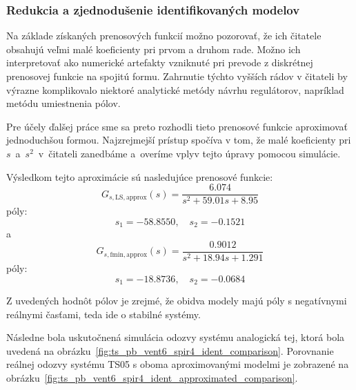 
\subsubsection{Redukcia a zjednodušenie identifikovaných modelov}

Na základe získaných prenosových funkcií možno pozorovať, že ich čitatele obsahujú veľmi malé koeficienty pri prvom a druhom rade.  
Možno ich interpretovať ako numerické artefakty vzniknuté pri prevode z diskrétnej prenosovej funkcie na spojitú formu.  
Zahrnutie týchto vyšších rádov v čitateli by výrazne komplikovalo niektoré analytické metódy návrhu regulátorov, napríklad metódu umiestnenia pólov.

Pre účely ďalšej práce sme sa preto rozhodli tieto prenosové funkcie aproximovať jednoduchšou formou.  
Najzrejmejší prístup spočíva v tom, že malé koeficienty pri $s$~a~$s^2$~v~čitateli zanedbáme a~overíme vplyv tejto úpravy pomocou simulácie.

Výsledkom tejto aproximácie sú nasledujúce prenosové funkcie:
\begin{equation}
	G_{s,\mathrm{LS,approx}}(s) =
	\frac{6.074}{s^2 + 59.01s + 8.95}
	\label{eq:Gs_ls_approx}
\end{equation}
póly:
\begin{equation}
	s_{1} = -58.8550, \quad s_{2} = -0.1521
	\label{eq:poles_ls_approx}
\end{equation}
a
\begin{equation}
	G_{s,\mathrm{fmin,approx}}(s) =
	\frac{0.9012}{s^2 + 18.94s + 1.291}
	\label{eq:Gs_fmin_approx}
\end{equation}
póly:
\begin{equation}
	s_{1} = -18.8736, \quad s_{2} = -0.0684
	\label{eq:poles_fmin_approx}
\end{equation}

Z uvedených hodnôt pólov je zrejmé, že obidva modely majú póly s negatívnymi reálnymi časťami, teda ide o stabilné systémy.

Následne bola uskutočnená simulácia odozvy systému analogická tej, ktorá bola uvedená na obrázku~\ref{fig:ts_pb_vent6_spir4_ident_comparison}.  
Porovnanie reálnej odozvy systému TS05 s oboma aproximovanými modelmi je zobrazené na obrázku~\ref{fig:ts_pb_vent6_spir4_ident_approximated_comparison}.

